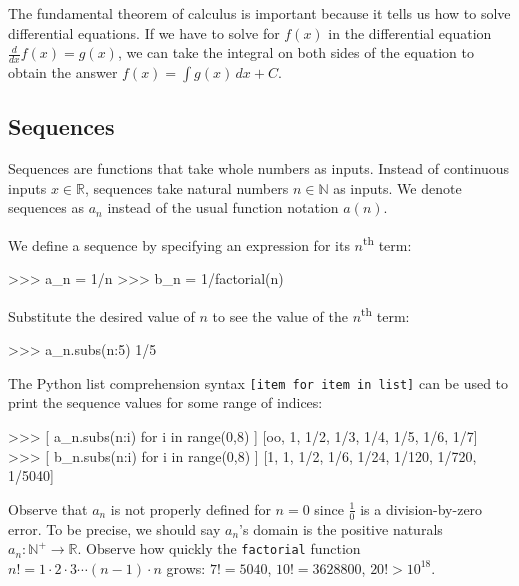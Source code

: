 \noindent
The fundamental theorem of calculus is important because it tells us how to solve differential equations.
If we have to solve for $f(x)$ in the differential equation $\frac{d}{dx}f(x) = g(x)$,
we can take the integral on both sides of the equation to obtain the answer $f(x) = \int g(x)\,dx + C$.

\subsection{Sequences}
\label{calculus:sequences}

Sequences are functions that take whole numbers as inputs.												
Instead of continuous inputs $x\in \mathbb{R}$,
sequences take natural numbers $n\in\mathbb{N}$ as inputs.
We denote sequences as $a_n$ instead of the usual function notation $a(n)$.

We define a sequence by specifying an expression for its $n$\textsuperscript{th} term:



\small
\begin{verbatimtab}
>>> a_n = 1/n
>>> b_n = 1/factorial(n)
\end{verbatimtab}
\normalsize

\noindent
Substitute the desired value of $n$ to see the value of the $n$\textsuperscript{th} term:

\small
\begin{verbatimtab}
>>> a_n.subs({n:5})
1/5
\end{verbatimtab}
\normalsize

\noindent
The Python list comprehension syntax \texttt{[item for item in list]}
can be used to print the sequence values for some range of indices:



\small
\begin{verbatimtab}
>>> [ a_n.subs({n:i}) for i in range(0,8) ]
[oo, 1, 1/2, 1/3, 1/4,  1/5,   1/6,   1/7]  
>>> [ b_n.subs({n:i}) for i in range(0,8) ]
[1,  1, 1/2, 1/6, 1/24, 1/120, 1/720, 1/5040]
\end{verbatimtab}
\normalsize

\noindent
Observe that $a_n$ is not properly defined for $n=0$ since $\frac{1}{0}$ is a division-by-zero error.
To be precise, we should say $a_n$'s domain is the positive naturals $a_n:\mathbb{N}^+ \to \mathbb{R}$.
Observe how quickly the \texttt{factorial} function $n!=1\cdot2\cdot3\cdots(n-1)\cdot n$ grows:
$7!= 5040$, $10!=3628800$, $20! > 10^{18}$.



